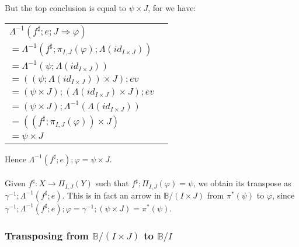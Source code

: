 \documentclass{article}
\begin{document}
But the top conclusion is equal to $\psi \times J$, for we have:
\begin{center}
\begin{tabular}{ll}
$\Lambda^{-1}(f^\sharp;e;J \Rightarrow \varphi)$ &  \\
$= \Lambda^{-1}(f^\sharp;\pi_{I,J}(\varphi);\Lambda(\mathit{id_{I \times J}}))$ &  \\ 
$= \Lambda^{-1}(\psi;\Lambda(\mathit{id_{I \times J}}))$ &  \\ 
$= ((\psi;\Lambda(\mathit{id_{I \times J}})) \times J);\mathit{ev}$ &  \\ 
$= (\psi \times J);(\Lambda(\mathit{id_{I \times J}}) \times J);\mathit{ev}$ & \\
$= (\psi \times J);\Lambda^{-1}(\Lambda(\mathit{id_{I \times J}}))$ & \\
$= ((f^\sharp;\pi_{I,J}(\varphi)) \times J)$ & \\
$= \psi \times J$ &
\end{tabular}
\end{center}
Hence $\Lambda^{-1}(f^\sharp;e);\varphi = \psi \times J$.\\~\\
Given $f^\sharp : X \to \Pi_{I,J}(Y)$ such that $f^\sharp;\Pi_{I,J}(\varphi)=\psi$, we obtain its transpose as 
$\gamma^{-1};\Lambda^{-1}(f^\sharp;e)$. This is in fact an arrow in $\mathbb B / (I \times J)$ from $\pi^{*}(\psi)$
to $\varphi$, since $\gamma^{-1};\Lambda^{-1}(f^\sharp;e);\varphi = \gamma^{-1};(\psi \times J) = \pi^*(\psi)$.

\subsubsection*{Transposing from $\mathbb B / (I \times J)$ to $\mathbb B / I$}
\end{document}
